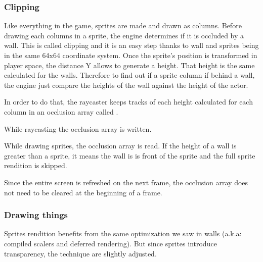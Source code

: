 \subsubsection{Clipping}
Like everything in the game, sprites are made and drawn as columns. Before drawing each columns in a sprite, the engine determines if it is occluded by a wall. This is called clipping and it is an easy step thanks to wall and sprites being in the same 64x64 coordinate system. Once the sprite's position is transformed in player space, the distance Y allows to generate a height. That height is the same calculated for the walls. Therefore to find out if a sprite column if behind a wall, the engine just compare the heights of the wall against the height of the actor.\\
\par
In order to do that, the raycaster keeps tracks of each height calculated for each column in an occlusion array called .\\
\par
\begin{minipage}{\textwidth}

\end{minipage}
\par
While raycasting the occlusion array is written.\\
\par
\begin{minipage}{\textwidth}

\end{minipage}
While drawing sprites, the occlusion array is read. If the height of a wall is greater than a sprite, it means the wall is is front of the sprite and the full sprite rendition is skipped.\\
\par
\begin{minipage}{\textwidth}

\end{minipage}
\par
Since the entire screen is refreshed on the next frame, the occlusion array does not need to be cleared at the beginning of a frame.





\subsubsection{Drawing things}
Sprites rendition benefits from the same optimization we saw in walls (a.k.a: compiled scalers and deferred rendering). But since sprites introduce transparency, the technique are slightly adjusted.

